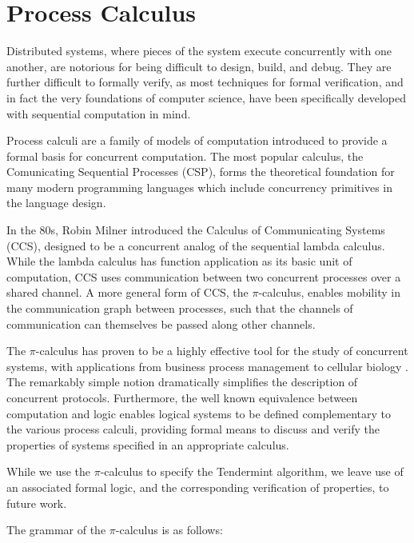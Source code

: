 \section{Process Calculus}

Distributed systems, where pieces of the system execute concurrently with one another,
are notorious for being difficult to design, build, and debug.
They are further difficult to formally verify, 
as most techniques for formal verification, and in fact the very foundations of computer science,
have been specifically developed with sequential computation in mind.

Process calculi are a family of models of computation introduced 
to provide a formal basis for concurrent computation.
The most popular calculus, the Comunicating Sequential Processes (CSP),
forms the theoretical foundation for many modern programming languages which 
include concurrency primitives in the language design.

In the 80s, Robin Milner introduced the Calculus of Communicating Systems (CCS), 
designed to be a concurrent analog of the sequential lambda calculus.
While the lambda calculus has function application as its basic unit of computation,
CCS uses communication between two concurrent processes over a shared channel.
A more general form of CCS, the $\pi$-calculus, 
enables mobility in the communication graph between processes, 
such that the channels of communication can themselves be passed along other channels.

The $\pi$-calculus has proven to be a highly effective tool for the study of concurrent systems,
with applications from business process management \cite{pi_biz} to cellular biology \cite{stochastic_pi}.
The remarkably simple notion dramatically simplifies the description of concurrent protocols.
Furthermore, the well known equivalence between computation and logic \cite{curry_howard} enables
logical systems to be defined complementary to the various process calculi,
providing formal means to discuss and verify the properties of systems specified in an appropriate calculus.

While we use the $\pi$-calculus to specify the Tendermint algorithm, 
we leave use of an associated formal logic, and the corresponding verification of properties, to future work.

The grammar of the $\pi$-calculus is as follows:
















